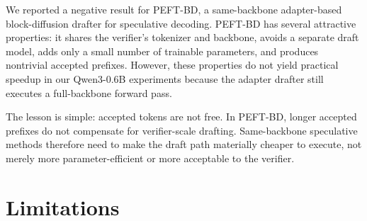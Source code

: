 \documentclass[11pt]{article}
\begin{document}
We reported a negative result for PEFT-BD, a same-backbone adapter-based block-diffusion drafter for speculative decoding. PEFT-BD has several attractive properties: it shares the verifier's tokenizer and backbone, avoids a separate draft model, adds only a small number of trainable parameters, and produces nontrivial accepted prefixes. However, these properties do not yield practical speedup in our Qwen3-0.6B experiments because the adapter drafter still executes a full-backbone forward pass.

The lesson is simple: accepted tokens are not free. In PEFT-BD, longer accepted prefixes do not compensate for verifier-scale drafting. Same-backbone speculative methods therefore need to make the draft path materially cheaper to execute, not merely more parameter-efficient or more acceptable to the verifier.


\section*{Limitations}
\end{document}
